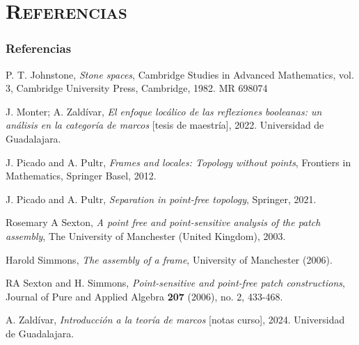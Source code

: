\documentclass[compress,12pt]{beamer}
\begin{document}
\section*{\textsc{Referencias}}
\begin{frame}[allowframebreaks]
\frametitle{Referencias}
\begin{thebibliography}{20}

 P. T. Johnstone, \textit{Stone spaces}, Cambridge Studies in Advanced Mathematics, vol. 3, Cambridge University Press, Cambridge, 1982. MR 698074


 J. Monter; A. Zaldívar, \textit{El enfoque locálico de las reflexiones booleanas: un análisis en la categoría de marcos} [tesis de maestría], 2022. Universidad de Guadalajara.

 J. Picado and A. Pultr, \textit{Frames and locales: Topology without points}, Frontiers in Mathematics, Springer Basel, 2012.

 J. Picado and A. Pultr, \textit{Separation in point-free topology}, Springer, 2021.

 Rosemary A Sexton, \textit{A point free and point-sensitive analysis of the patch assembly}, The University of Manchester (United Kingdom), 2003.

 Harold Simmons, \textit{The assembly of a frame}, University of Manchester (2006).

 RA Sexton and H. Simmons, \textit{Point-sensitive and point-free patch constructions}, Journal of Pure and Applied Algebra \textbf{207} (2006), no. 2, 433-468.

 A. Zaldívar, \textit{Introducción a la teoría de marcos} [notas curso], 2024. Universidad de Guadalajara.

\end{thebibliography}
\end{frame}
\end{document}
